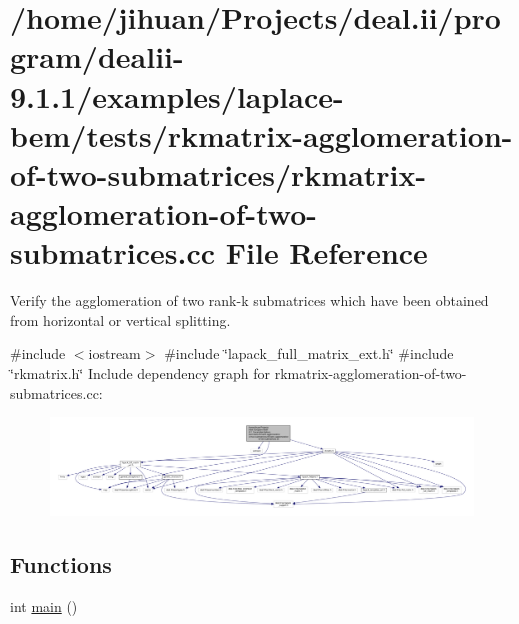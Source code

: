 \hypertarget{rkmatrix-agglomeration-of-two-submatrices_8cc}{}\section{/home/jihuan/\+Projects/deal.ii/program/dealii-\/9.1.1/examples/laplace-\/bem/tests/rkmatrix-\/agglomeration-\/of-\/two-\/submatrices/rkmatrix-\/agglomeration-\/of-\/two-\/submatrices.cc File Reference}
\label{rkmatrix-agglomeration-of-two-submatrices_8cc}


Verify the agglomeration of two rank-\/k submatrices which have been obtained from horizontal or vertical splitting.  


{\ttfamily \#include $<$iostream$>$}\newline
{\ttfamily \#include \char`\"{}lapack\+\_\+full\+\_\+matrix\+\_\+ext.\+h\char`\"{}}\newline
{\ttfamily \#include \char`\"{}rkmatrix.\+h\char`\"{}}\newline
Include dependency graph for rkmatrix-\/agglomeration-\/of-\/two-\/submatrices.cc\+:\nopagebreak
\begin{figure}[H]
\begin{center}
\leavevmode
\includegraphics[width=350pt]{rkmatrix-agglomeration-of-two-submatrices_8cc__incl}
\end{center}
\end{figure}
\subsection*{Functions}
\begin{DoxyCompactItemize}
\item 
int \hyperlink{rkmatrix-agglomeration-of-two-submatrices_8cc_ae66f6b31b5ad750f1fe042a706a4e3d4}{main} ()
\end{DoxyCompactItemize}


